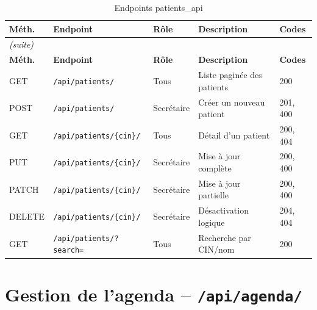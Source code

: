 \documentclass[12pt,a4paper]{report}
\begin{document}
\begin{longtable}{|p{1.5cm}|p{4cm}|p{2.5cm}|p{3.5cm}|p{1.5cm}|}
  \caption{Endpoints patients\_api} \\
  \hline
  \rowcolor{medaccent}
  \textbf{Méth.} & \textbf{Endpoint} & \textbf{Rôle} & \textbf{Description} & \textbf{Codes} \\
  \hline
  \endfirsthead
  \multicolumn{5}{l}{\small\textit{(suite)}} \\
  \hline
  \rowcolor{medaccent}
  \textbf{Méth.} & \textbf{Endpoint} & \textbf{Rôle} & \textbf{Description} & \textbf{Codes} \\
  \hline
  \endhead
  \hline
  \endfoot
  GET & \texttt{/api/patients/} & Tous & Liste paginée des patients & 200 \\
  \hline
  POST & \texttt{/api/patients/} & Secrétaire & Créer un nouveau patient & 201, 400 \\
  \hline
  GET & \texttt{/api/patients/\{cin\}/} & Tous & Détail d'un patient & 200, 404 \\
  \hline
  PUT & \texttt{/api/patients/\{cin\}/} & Secrétaire & Mise à jour complète & 200, 400 \\
  \hline
  PATCH & \texttt{/api/patients/\{cin\}/} & Secrétaire & Mise à jour partielle & 200, 400 \\
  \hline
  DELETE & \texttt{/api/patients/\{cin\}/} & Secrétaire & Désactivation logique & 204, 404 \\
  \hline
  GET & \texttt{/api/patients/?search=} & Tous & Recherche par CIN/nom & 200 \\
  \hline
\end{longtable}

\section{Gestion de l'agenda -- \texttt{/api/agenda/}}
\end{document}
